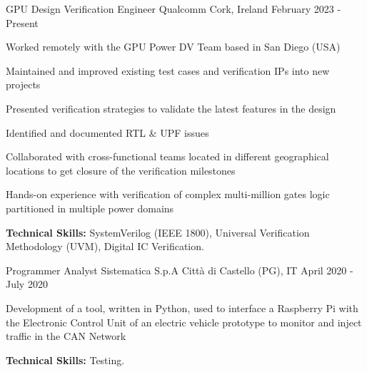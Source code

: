 

\begin{cventries}

  \cventry
    {GPU Design Verification Engineer} %
    {Qualcomm} %
    {Cork, Ireland} %
    {February 2023 - Present} %
    {
      \begin{cvitems} %
        \item {Worked remotely with the GPU Power DV Team based in San Diego (USA)}
        \item {Maintained and improved existing test cases and verification IPs into new projects}
        \item {Presented verification strategies to validate the latest features in the design}
        \item {Identified and documented RTL \& UPF issues}
        \item {Collaborated with cross-functional teams located in different geographical locations to get closure of the verification milestones}
        \item {Hands-on experience with verification of complex multi-million gates logic partitioned in multiple power domains}
        \item {\textbf{Technical Skills:} SystemVerilog (IEEE 1800), Universal Verification Methodology (UVM), Digital IC Verification.}
      \end{cvitems}
    }

  \cventry
    {Programmer Analyst} %
    {Sistematica S.p.A} %
    {Città di Castello (PG), IT} %
    {April 2020 - July 2020} %
    {
      \begin{cvitems} %
        \item {Development of a tool, written in Python, used to interface a Raspberry Pi with the Electronic Control Unit of an electric vehicle prototype to monitor and inject traffic in the CAN Network}
        \item {\textbf{Technical Skills:} Testing.}
      \end{cvitems}
    }


\end{cventries}
